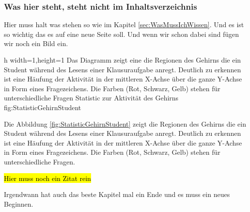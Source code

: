 \newpage %
\subsubsection{Was hier steht, steht nicht im Inhaltsverzeichnis} %
\label{subsubSec:HierMussWasHin}

Hier muss halt was stehen so wie im Kapitel \ref{sec:WasMussIchWissen}. Und es ist so wichtig das es auf eine neue Seite soll. Und wenn wir schon dabei sind fügen wir noch ein Bild ein.

        {h} 			  %
        {width=1\textwidth,height=1\textheight} %
        {Das Diagramm zeigt eine die Regionen des Gehirns die ein Student während des Lesens einer Klausuraufgabe anregt. Deutlich zu erkennen ist eine Häufung der Aktivität in der mittleren X-Achse über die ganze Y-Achse in Form eines Fragezeichens. Die Farben (Rot, Schwarz, Gelb) stehen für unterschiedliche Fragen} %
        {Statistic zur Aktivität des Gehirns} %
        {fig:StatisticGehirnStudent}		  %
        
Die Abbildung \ref{fig:StatisticGehirnStudent} zeigt die Regionen des Gehirns die ein Student während des Lesens einer Klausuraufgabe anregt. Deutlich zu erkennen ist eine Häufung der Aktivität in der mittleren X-Achse über die ganze Y-Achse in Form eines Fragezeichens. Die Farben (Rot, Schwarz, Gelb) stehen für unterschiedliche Fragen.

\hl{Hier muss noch ein Zitat rein} \autocite{Boelmann} 

Irgendwann hat auch das beste Kapitel mal ein Ende und es muss ein neues Beginnen.
        






